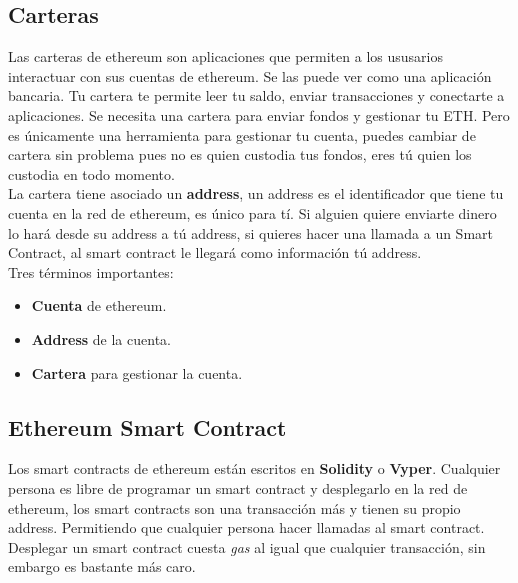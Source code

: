 \subsection{Carteras}

Las carteras de ethereum son aplicaciones que permiten a los ususarios interactuar con sus cuentas de ethereum. Se las puede ver como una aplicación bancaria. Tu cartera te permite leer tu saldo, enviar transacciones y conectarte a aplicaciones. Se necesita una cartera para enviar fondos y gestionar tu ETH. Pero es únicamente una herramienta para gestionar tu cuenta, puedes cambiar de cartera sin problema pues no es quien custodia tus fondos, eres tú quien los custodia en todo momento. \\

La cartera tiene asociado un \textbf{address}, un address es el identificador que tiene tu cuenta en la red de ethereum, es único para tí. Si alguien quiere enviarte dinero lo hará desde su address a tú address, si quieres hacer una llamada a un Smart Contract, al smart contract le llegará como información tú address. \\

Tres términos importantes:
\begin{itemize}
\item \textbf{Cuenta} de ethereum.
\item \textbf{Address} de la cuenta.
\item \textbf{Cartera} para gestionar la cuenta.
\end{itemize}

\subsection{Ethereum Smart Contract}

Los smart contracts de ethereum están escritos en \textbf{Solidity}\cite{SolidityDocs} o \textbf{Vyper}\cite{VyperDocs}. Cualquier persona es libre de programar un smart contract y desplegarlo en la red de ethereum, los smart contracts son una transacción más y tienen su propio address. Permitiendo que cualquier persona hacer llamadas al smart contract. Desplegar un smart contract cuesta \emph{gas} al igual que cualquier transacción, sin embargo es bastante más caro. 

